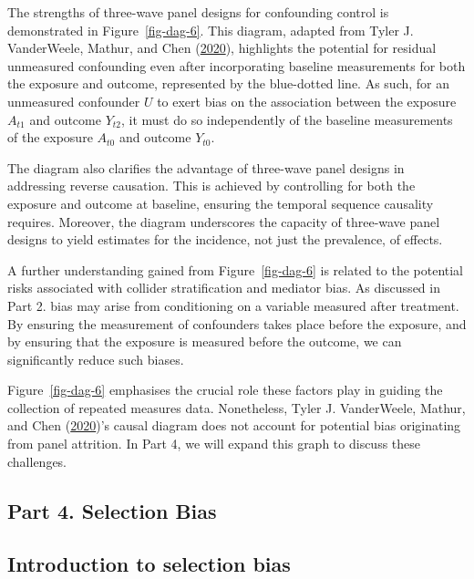 \documentclass[
  singlecolumn]{report}
\begin{document}
The strengths of three-wave panel designs for confounding control is
demonstrated in Figure~\ref{fig-dag-6}. This diagram, adapted from Tyler
J. VanderWeele, Mathur, and Chen
(\protect\hyperlink{ref-vanderweele2020}{2020}), highlights the
potential for residual unmeasured confounding even after incorporating
baseline measurements for both the exposure and outcome, represented by
the blue-dotted line. As such, for an unmeasured confounder \(U\) to
exert bias on the association between the exposure \(A_{t1}\) and
outcome \(Y_{t2}\), it must do so independently of the baseline
measurements of the exposure \(A_{t0}\) and outcome \(Y_{t0}\).

The diagram also clarifies the advantage of three-wave panel designs in
addressing reverse causation. This is achieved by controlling for both
the exposure and outcome at baseline, ensuring the temporal sequence
causality requires. Moreover, the diagram underscores the capacity of
three-wave panel designs to yield estimates for the incidence, not just
the prevalence, of effects.

A further understanding gained from Figure~\ref{fig-dag-6} is related to
the potential risks associated with collider stratification and mediator
bias. As discussed in Part 2. bias may arise from conditioning on a
variable measured after treatment. By ensuring the measurement of
confounders takes place before the exposure, and by ensuring that the
exposure is measured before the outcome, we can significantly reduce
such biases.

Figure~\ref{fig-dag-6} emphasises the crucial role these factors play in
guiding the collection of repeated measures data. Nonetheless, Tyler J.
VanderWeele, Mathur, and Chen
(\protect\hyperlink{ref-vanderweele2020}{2020})'s causal diagram does
not account for potential bias originating from panel attrition. In Part
4, we will expand this graph to discuss these challenges.

\hypertarget{part-4.-selection-bias}{%
\subsection{Part 4. Selection Bias}\label{part-4.-selection-bias}}

\hypertarget{introduction-to-selection-bias}{%
\subsection{Introduction to selection
bias}\label{introduction-to-selection-bias}}
\end{document}

